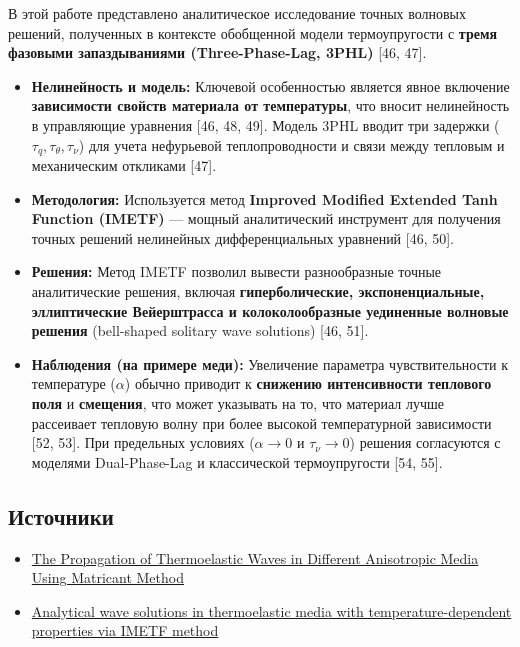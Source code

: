 \documentclass{article}
\begin{document}
В этой работе представлено аналитическое исследование точных волновых решений, полученных в контексте обобщенной модели термоупругости с \textbf{тремя фазовыми запаздываниями (Three-Phase-Lag, 3PHL)} [46, 47].
\begin{itemize}
    \item \textbf{Нелинейность и модель:} Ключевой особенностью является явное включение \textbf{зависимости свойств материала от температуры}, что вносит нелинейность в управляющие уравнения [46, 48, 49]. Модель 3PHL вводит три задержки ($\tau_q, \tau_\theta, \tau_\nu$) для учета нефурьевой теплопроводности и связи между тепловым и механическим откликами [47].
    \item \textbf{Методология:} Используется метод \textbf{Improved Modified Extended Tanh Function (IMETF)} — мощный аналитический инструмент для получения точных решений нелинейных дифференциальных уравнений [46, 50].
    \item \textbf{Решения:} Метод IMETF позволил вывести разнообразные точные аналитические решения, включая \textbf{гиперболические, экспоненциальные, эллиптические Вейерштрасса и колоколообразные уединенные волновые решения} (bell-shaped solitary wave solutions) [46, 51].
    \item \textbf{Наблюдения (на примере меди):} Увеличение параметра чувствительности к температуре ($\alpha$) обычно приводит к \textbf{снижению интенсивности теплового поля} и \textbf{смещения}, что может указывать на то, что материал лучше рассеивает тепловую волну при более высокой температурной зависимости [52, 53]. При предельных условиях ($\alpha \to 0$ и $\tau_\nu \to 0$) решения согласуются с моделями Dual-Phase-Lag и классической термоупругости [54, 55].
\end{itemize}


\subsection*{Источники}
    \begin{itemize}
        \item \href{https://pdfs.semanticscholar.org/488a/91fa54fe48b2a361f9a4caafd9e606447f7f.pdf}{The Propagation of Thermoelastic Waves in Different Anisotropic Media Using Matricant Method}
    \end{itemize}


    \begin{itemize}
        \item \href{https://www.nature.com/articles/s41598-025-09344-w.pdf}{Analytical wave solutions in thermoelastic media with temperature-dependent properties via IMETF method}
    \end{itemize}
\end{document}
